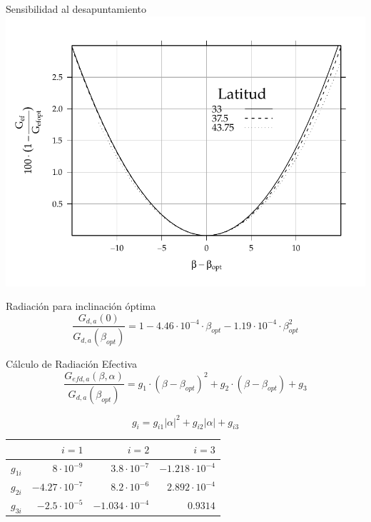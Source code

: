 \documentclass[xcolor={usenames,svgnames,dvipsnames}]{beamer}
\begin{document}
\begin{frame}[label=sec-5-1-2]{Sensibilidad al desapuntamiento}
\includegraphics[width=.9\linewidth]{../figs/PerdidasInclinacionOptima.pdf}
\end{frame}

\begin{frame}[label=sec-5-1-3]{Radiación para inclinación óptima}
\[\frac{G_{d,a}(0)}{G_{d,a}(\beta_{opt})}=1-4.46\cdot10^{-4}\cdot\beta_{opt}-1.19\cdot10^{-4}\cdot\beta_{opt}^{2}\]
\end{frame}

\begin{frame}[label=sec-5-1-4]{Cálculo de Radiación Efectiva}
\[
\frac{G_{efd,a}(\beta,\alpha)}{G_{d,a}(\beta_{opt})} = g_{1}\cdot(\beta-\beta_{opt})^{2}+g_{2}\cdot(\beta-\beta_{opt})+g_{3}
\]

\[
g_{i} = g_{i1}|\alpha|^{2}+g_{i2}|\alpha|+g_{i3}
\]

\begin{center}
\begin{tabular}{lrrr}
 & $i=1$ & $i=2$ & $i=3$\\
\hline
$g_{1i}$ & $8\cdot10^{-9}$ & $3.8\cdot10^{-7}$ & $-1.218\cdot10^{-4}$\\
$g_{2i}$ & $-4.27\cdot10^{-7}$ & $8.2\cdot10^{-6}$ & $2.892\cdot10^{-4}$\\
$g_{3i}$ & $-2.5\cdot10^{-5}$ & $-1.034\cdot10^{-4}$ & $0.9314$\\
\end{tabular}
\end{center}
\end{frame}
\end{document}
